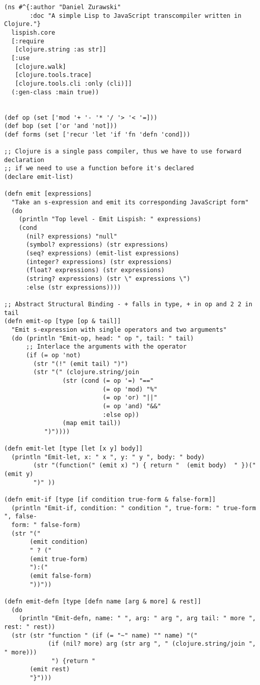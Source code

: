 \begin{verbatim}
(ns #^{:author "Daniel Zurawski"
       :doc "A simple Lisp to JavaScript transcompiler written in Clojure."}
  lispish.core
  [:require
   [clojure.string :as str]]
  [:use
   [clojure.walk]
   [clojure.tools.trace]
   [clojure.tools.cli :only (cli)]]
  (:gen-class :main true))


(def op (set ['mod '+ '- '* '/ '> '< '=]))
(def bop (set ['or 'and 'not]))
(def forms (set ['recur 'let 'if 'fn 'defn 'cond]))

;; Clojure is a single pass compiler, thus we have to use forward declaration
;; if we need to use a function before it's declared
(declare emit-list)

(defn emit [expressions]
  "Take an s-expression and emit its corresponding JavaScript form"
  (do
    (println "Top level - Emit Lispish: " expressions)
    (cond
      (nil? expressions) "null"
      (symbol? expressions) (str expressions)
      (seq? expressions) (emit-list expressions)
      (integer? expressions) (str expressions)
      (float? expressions) (str expressions)
      (string? expressions) (str \" expressions \")
      :else (str expressions))))

;; Abstract Structural Binding - + falls in type, + in op and 2 2 in tail
(defn emit-op [type [op & tail]]
  "Emit s-expression with single operators and two arguments"
  (do (println "Emit-op, head: " op ", tail: " tail)
      ;; Interlace the arguments with the operator
      (if (= op 'not)
        (str "(!" (emit tail) ")")
        (str "(" (clojure.string/join
                (str (cond (= op '=) "=="
                           (= op 'mod) "%"
                           (= op 'or) "||"
                           (= op 'and) "&&"
                           :else op))
                (map emit tail))
           ")"))))

(defn emit-let [type [let [x y] body]]
  (println "Emit-let, x: " x ", y: " y ", body: " body)
        (str "(function(" (emit x) ") { return "  (emit body)  " })(" (emit y) 
        ")" ))

(defn emit-if [type [if condition true-form & false-form]]
  (println "Emit-if, condition: " condition ", true-form: " true-form ", false-
  form: " false-form)
  (str "("
       (emit condition)
       " ? ("
       (emit true-form)
       "):("
       (emit false-form)
       "))"))

(defn emit-defn [type [defn name [arg & more] & rest]]
  (do
    (println "Emit-defn, name: " ", arg: " arg ", arg tail: " more ", rest: " rest))
  (str (str "function " (if (= "~" name) "" name) "("
            (if (nil? more) arg (str arg ", " (clojure.string/join ", " more)))
             ") {return "
       (emit rest)
       "}")))


\end{verbatim}
